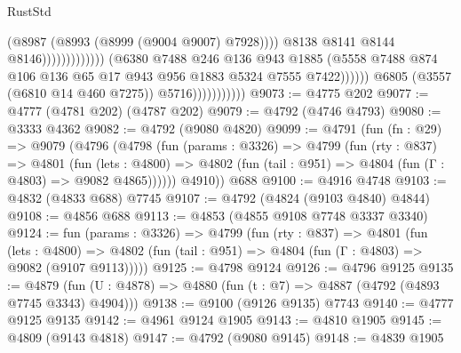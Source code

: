 \begin{lexlean}{RustStd}
\begin{coremodule}
                                                              (@8987
                                                                (@8993
                                                                  (@8999 (@9004 @9007) @7928))))
                                                            @8138
                                                            @8141
                                                            @8144
                                                            @8146)))))))))))))
                                  (@6380
                                    @7488
                                    @246
                                    @136
                                    @943
                                    @1885
                                    (@5558
                                      @7488
                                      @874
                                      @106
                                      @136
                                      @65
                                      @17
                                      @943
                                      @956
                                      @1883
                                      @5324
                                      @7555
                                      @7422))))))
                          @6805
                          (@3557 (@6810 @14 @460 @7275))
                          @5716)))))))))))
@9073 := @4775 @202
@9077 := @4777 (@4781 @202) (@4787 @202)
@9079 := @4792 (@4746 @4793)
@9080 := @3333 @4362
@9082 := @4792 (@9080 @4820)
@9099 := @4791
    (fun (fn : @29) =>
    @9079
      (@4796
        (@4798
          (fun (params : @3326) =>
          @4799
            (fun (rty : @837) =>
            @4801
              (fun (lets : @4800) =>
              @4802 (fun (tail : @951) => @4804 (fun (Γ : @4803) => @9082 @4865))))))
        @4910))
    @688
@9100 := @4916 @4748
@9103 := @4832 (@4833 @688) @7745
@9107 := @4792 (@4824 (@9103 @4840) @4844)
@9108 := @4856 @688
@9113 := @4853 (@4855 @9108 @7748 @3337 @3340)
@9124 := fun (params : @3326) =>
  @4799
    (fun (rty : @837) =>
    @4801
      (fun (lets : @4800) =>
      @4802 (fun (tail : @951) => @4804 (fun (Γ : @4803) => @9082 (@9107 @9113)))))
@9125 := @4798 @9124
@9126 := @4796 @9125
@9135 := @4879 (fun (U : @4878) => @4880 (fun (t : @7) => @4887 (@4792 (@4893 @7745 @3343) @4904)))
@9138 := @9100 (@9126 @9135) @7743
@9140 := @4777 @9125 @9135
@9142 := @4961 @9124 @1905
@9143 := @4810 @1905
@9145 := @4809 (@9143 @4818)
@9147 := @4792 (@9080 @9145)
@9148 := @4839 @1905

\end{coremodule}
\end{lexlean}

